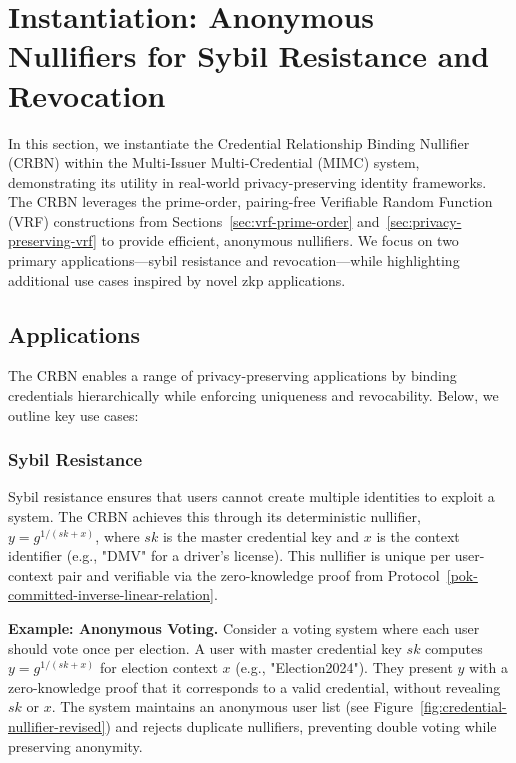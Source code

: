 \section{Instantiation: Anonymous Nullifiers for Sybil Resistance and Revocation}\label{sec-vrf-instantiation}

In this section, we instantiate the Credential Relationship Binding Nullifier (CRBN) within the Multi-Issuer Multi-Credential (MIMC) system, demonstrating its utility in real-world privacy-preserving identity frameworks. The CRBN leverages the prime-order, pairing-free Verifiable Random Function (VRF) constructions from Sections~\ref{sec:vrf-prime-order} and~\ref{sec:privacy-preserving-vrf} to provide efficient, anonymous nullifiers. We focus on two primary applications—sybil resistance and revocation—while highlighting additional use cases inspired by novel zkp applications. 

\subsection{Applications}\label{subsec:applications}

The CRBN enables a range of privacy-preserving applications by binding credentials hierarchically while enforcing uniqueness and revocability. Below, we outline key use cases:

\subsubsection{Sybil Resistance}\label{subsubsec:sybil-resistance}
Sybil resistance ensures that users cannot create multiple identities to exploit a system. The CRBN achieves this through its deterministic nullifier, $y = g^{1/(sk + x)}$, where $sk$ is the master credential key and $x$ is the context identifier (e.g., "DMV" for a driver's license). This nullifier is unique per user-context pair and verifiable via the zero-knowledge proof from Protocol~\ref{pok-committed-inverse-linear-relation}.

\textbf{Example: Anonymous Voting.} Consider a voting system where each user should vote once per election. A user with master credential key $sk$ computes $y = g^{1/(sk + x)}$ for election context $x$ (e.g., "Election2024"). They present $y$ with a zero-knowledge proof that it corresponds to a valid credential, without revealing $sk$ or $x$. The system maintains an anonymous user list (see Figure~\ref{fig:credential-nullifier-revised}) and rejects duplicate nullifiers, preventing double voting while preserving anonymity.

